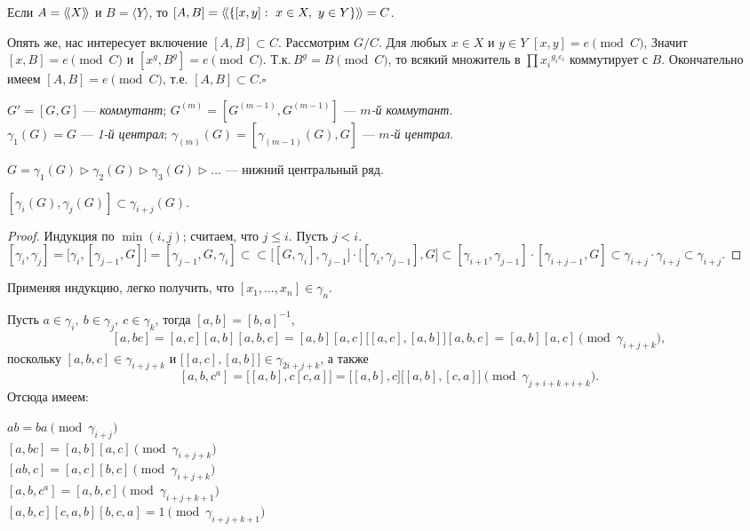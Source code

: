 \documentclass[10pt,a4paper,draft]{article}
\begin{document}
\begin{ex}
Если $A=\langle\!\langle X\rangle\!\rangle$ и $B=\langle Y\rangle$, то $[A,B]=\langle\!\langle\{[x,y]:~x\in X,~y\in
Y\}\rangle\!\rangle=C$.

Опять же, нас интересует включение $[A,B]\subset C$. Рассмотрим
$G/C$. Для любых $x\in X$ и $y\in Y$ $[x,y]=e\pmod C$, Значит
$[x,B]=e\pmod C$ и $[x^g,B^g]=e\pmod C$. Т.к.\,$B^g=B\pmod{C}$, то
всякий множитель в $\prod {x_i}^{g_i\varepsilon_i}$ коммутирует с
$B$. Окончательно имеем $[A,B]=e\pmod C$, т.е. $[A,B]\subset
C$.$\square$
\end{ex}

$G'=[G,G]$ --- {\em коммутант};
$G^{(m)}=[G^{(m-1)},G^{(m-1)}]$
--- {\em $m$-й коммутант}.
\\ $\gamma_1(G)=G$ --- {\em 1-й централ}; $\gamma_{(m)}(G)=[\gamma_{(m-1)}(G),G]$
--- {\em $m$-й централ}.

$G=\gamma_1(G)\rhd\gamma_2(G)\rhd\gamma_3(G)\rhd\dots$
--- нижний центральный ряд.

\begin{lemma}
{$[\gamma_i(G),\gamma_j(G)]\subset\gamma_{i+j}(G)$.}
\end{lemma}

\begin{proof} Индукция по $\min(i,j)$; считаем, что $j\leq i$. Пусть
$j<i$.
$[\gamma_i,\gamma_j]=\big[\gamma_i,[\gamma_{j-1},G]\big]=[\gamma_{j-1},G,\gamma_i]\subset
{\subset\big[[G,\gamma_i],\gamma_{j-1}\big]}\cdot\big[[\gamma_i,\gamma_{j-1}],G\big]\subset[\gamma_{i+1},
\gamma_{j-1}]
\cdot[\gamma_{i+j-1},G]\subset\gamma_{i+j}\cdot\gamma_{i+j}\subset\gamma_{i+j}$.\end{proof}

Применяя индукцию, легко получить, что
$[x_1,\dots,x_n]\in\gamma_n$.

\vskip 2pt Пусть $a\in\gamma_i,~b\in\gamma_j,~c\in\gamma_k$, тогда
$[a,b]=[b,a]^{-1}$,
$$[a,bc]=[a,c][a,b][a,b,c]=
[a,b][a,c]\big[[a,c],[a,b]\big][a,b,c]=[a,b][a,c]\pmod{\gamma_{i+j+k}},$$
поскольку $[a,b,c]\in\gamma_{i+j+k}$ и
$\big[[a,c],[a,b]\big]\in\gamma_{2i+j+k}$, а также
$$[a,b,c^a]=\big[[a,b],c[c,a]\big]=\big[[a,b],c\big]
\big[[a,b],[c,a]\big]\pmod{\gamma_{j+i+k+i+k}}.$$
Отсюда имеем:
\begin{center}
$ab=ba\pmod{\gamma_{i+j}}$
\\ $[a,bc]=[a,b][a,c]\pmod{\gamma_{i+j+k}}$
\\ $[ab,c]=[a,c][b,c]\pmod{\gamma_{i+j+k}}$
\\ $[a,b,c^a]=[a,b,c]\pmod{\gamma_{i+j+k+1}}$
\\ $[a,b,c][c,a,b][b,c,a]=1\pmod{\gamma_{i+j+k+1}}$
\end{center}
\end{document}
